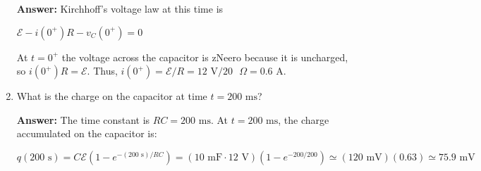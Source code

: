 \documentclass{article}
\begin{document}
\begin{enumerate}
        \ifsolutions
        {\bf Answer:} Kirchhoff's voltage law at this time is

        $\mathcal{E}-i(0^+)R-v_C(0^+)=0$

        At $t=0^+$ the voltage across the capacitor is zNeero because it is uncharged, so $i(0^+)R=\mathcal{E}$. Thus, $i(0^+) = \mathcal{E}/R = 12\text{ V}/20\text{ }\Omega = 0.6\text{ A}$.
        \else
        \vskip 56.25pt
        \fi
        \ifsolutions\else
        \vskip 56.25pt
        \fi

  \item What is the charge on the capacitor at time $t = 200\text{ ms}$?

        \ifsolutions
        {\bf Answer: } The time constant is $RC=200\text{ ms}$. At $t=200\text{ ms}$, the charge accumulated on the capacitor is:

        \begin{equation}
        q(200\text{ s}) = C\mathcal{E}(1-e^{-(200\text{ s})/RC}) = (10\text{ mF} \cdot 12\text{ V})(1-e^{-200/200})\simeq (120\text{ mV})(0.63)\simeq 75.9\text{ mV}
        \end{equation}
        \else

        \fi
        \ifsolutions\else

        \fi

\end{enumerate}
\end{document}
